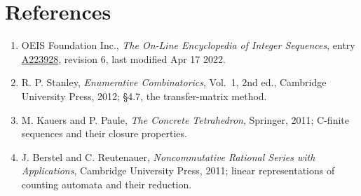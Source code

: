\documentclass[11pt]{article}
\theoremstyle{definition}
\begin{document}
\section{References}

\begin{enumerate}

\item OEIS Foundation Inc., \emph{The On-Line Encyclopedia of Integer Sequences}, entry \href{https://oeis.org/A223928}{A223928}, revision 6, last modified Apr 17 2022.

\item R. P. Stanley, \emph{Enumerative Combinatorics}, Vol.~1, 2nd ed., Cambridge University Press, 2012; \S4.7, the transfer-matrix method.

\item M. Kauers and P. Paule, \emph{The Concrete Tetrahedron}, Springer, 2011; C-finite sequences and their closure properties.

\item J. Berstel and C. Reutenauer, \emph{Noncommutative Rational Series with Applications}, Cambridge University Press, 2011; linear representations of counting automata and their reduction.

\end{enumerate}
\end{document}
